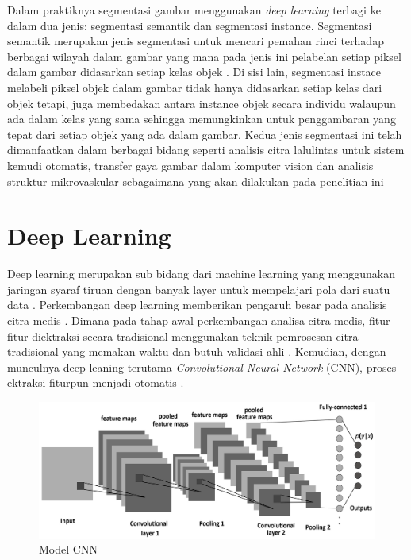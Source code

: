 \noindent Dalam praktiknya segmentasi gambar menggunakan \textit{deep learning} terbagi ke dalam dua jenis: segmentasi semantik dan segmentasi instance. Segmentasi semantik merupakan jenis segmentasi untuk mencari pemahan rinci terhadap berbagai wilayah dalam gambar yang mana pada jenis ini pelabelan setiap piksel dalam gambar didasarkan setiap kelas objek \cite{fan_image_2023}. Di sisi lain, segmentasi instace melabeli piksel objek dalam gambar tidak hanya didasarkan setiap kelas dari objek tetapi, juga membedakan antara instance objek  secara individu walaupun ada dalam kelas yang sama sehingga memungkinkan untuk penggambaran yang tepat dari setiap objek yang ada dalam gambar. Kedua jenis segmentasi ini telah dimanfaatkan dalam berbagai bidang seperti analisis citra lalulintas untuk sistem kemudi otomatis, transfer gaya gambar dalam komputer vision dan analisis struktur mikrovaskular sebagaimana yang akan dilakukan pada penelitian ini \cite{wang_traffic_2023, zhang_image_2023, sultan_microvasculature_2023}


\section{Deep Learning}

\noindent Deep learning merupakan sub bidang dari machine learning yang menggunakan jaringan syaraf tiruan dengan banyak layer untuk mempelajari pola dari suatu data \cite{goodfellow_deep_2016,yang_deep_2023}. Perkembangan deep learning memberikan pengaruh besar pada analisis citra medis \cite{sistaninejhad_review_2023}. Dimana pada tahap awal perkembangan analisa citra medis, fitur-fitur diektraksi secara tradisional menggunakan teknik pemrosesan citra tradisional yang memakan waktu dan butuh validasi ahli \cite{huang_fully_2022}.  Kemudian, dengan munculnya deep leaning terutama \textit{Convolutional Neural Network} (CNN), proses ektraksi fiturpun menjadi otomatis \cite{huang_fully_2022,azad_medical_2022}. 

\begin{figure}[H]
	\centering
	\includegraphics[scale=.08]{gambar/CNN.PNG}
	\caption{Model CNN \cite{albelwi_framework_2017}}
	\label{fig:CNN}
\end{figure}


